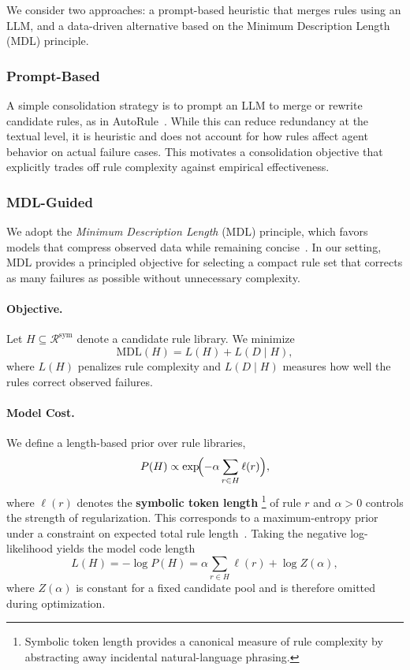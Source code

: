 \documentclass[11pt]{article}
\begin{document}
We consider two approaches: a prompt-based heuristic that merges rules using an LLM, and a data-driven alternative based on the Minimum Description Length (MDL) principle.


\subsubsection{Prompt-Based}

A simple consolidation strategy is to prompt an LLM to merge or rewrite candidate rules,
as in AutoRule~\citep{wang2025autorule}. While this can reduce redundancy at the textual
level, it is heuristic and does not account for how rules affect agent behavior on actual
failure cases. This motivates a consolidation objective that explicitly trades off rule
complexity against empirical effectiveness.


\subsubsection{MDL-Guided}
\label{sec:mdl}

We adopt the \emph{Minimum
Description Length} (MDL) principle, which favors models that compress observed data while
remaining concise~\citep{rissanen1978modeling,Grunwald07MDL}. In our setting, MDL provides
a principled objective for selecting a compact rule set that corrects as many failures as
possible without unnecessary complexity.

\paragraph{Objective.}
Let \( H \subseteq \mathcal{R}^{\text{sym}} \) denote a candidate rule library. We minimize
\[
\mathrm{MDL}(H) = L(H) + L(D \mid H),
\]
where \( L(H) \) penalizes rule complexity and \( L(D \mid H) \) measures how well the rules
correct observed failures.

\paragraph{Model Cost.}
We define a length-based prior over rule libraries,
\[
P(H) \propto \exp\!\Bigl(-\alpha \sum_{r \in H} \ell(r)\Bigr),
\]
where \( \ell(r) \) denotes the \textbf{symbolic token length}
\footnote{Symbolic token length provides a canonical measure of rule complexity by
abstracting away incidental natural-language phrasing.}
of rule \( r \) and \( \alpha > 0 \)
controls the strength of regularization. This corresponds to a maximum-entropy prior under
a constraint on expected total rule length~\citep{jaynes1957maxent}. Taking the negative
log-likelihood yields the model code length
\[
L(H) = -\log P(H) = \alpha \sum_{r \in H} \ell(r) + \log Z(\alpha),
\]
where \( Z(\alpha) \) is constant for a fixed candidate pool and is therefore omitted during
optimization.
\end{document}
